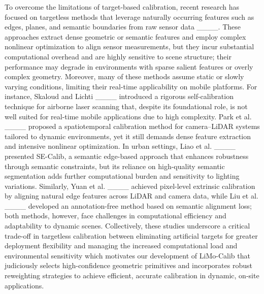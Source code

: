 To overcome the limitations of target-based calibration, recent research has focused on targetless methods that leverage naturally occurring features such as edges, planes, and semantic boundaries from raw sensor data ____. These approaches extract dense geometric or semantic features and employ complex nonlinear optimization to align sensor measurements, but they incur substantial computational overhead and are highly sensitive to scene structure; their performance may degrade in environments with sparse salient features or overly complex geometry. Moreover, many of these methods assume static or slowly varying conditions, limiting their real-time applicability on mobile platforms. For instance, Skaloud and Lichti ____ introduced a rigorous self-calibration technique for airborne laser scanning that, despite its foundational role, is not well suited for real-time mobile applications due to high complexity. Park et al. ____ proposed a spatiotemporal calibration method for camera–LiDAR systems tailored to dynamic environments, yet it still demands dense feature extraction and intensive nonlinear optimization. In urban settings, Liao et al. ____ presented SE-Calib, a semantic edge-based approach that enhances robustness through semantic constraints, but its reliance on high-quality semantic segmentation adds further computational burden and sensitivity to lighting variations. Similarly, Yuan et al. ____ achieved pixel-level extrinsic calibration by aligning natural edge features across LiDAR and camera data, while Liu et al. ____ developed an annotation-free method based on semantic alignment loss; both methods, however, face challenges in computational efficiency and adaptability to dynamic scenes. Collectively, these studies underscore a critical trade-off in targetless calibration between eliminating artificial targets for greater deployment flexibility and managing the increased computational load and environmental sensitivity which motivates our development of LiMo-Calib that judiciously selects high-confidence geometric primitives and incorporates robust reweighting strategies to achieve efficient, accurate calibration in dynamic, on-site applications.


